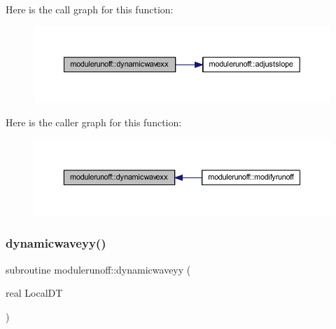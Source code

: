 Here is the call graph for this function\+:
\nopagebreak
\begin{figure}[H]
\begin{center}
\leavevmode
\includegraphics[width=350pt]{namespacemodulerunoff_a18db45ec88a4cf69a97c7b95648bc264_cgraph}
\end{center}
\end{figure}
Here is the caller graph for this function\+:
\nopagebreak
\begin{figure}[H]
\begin{center}
\leavevmode
\includegraphics[width=350pt]{namespacemodulerunoff_a18db45ec88a4cf69a97c7b95648bc264_icgraph}
\end{center}
\end{figure}
\mbox{\label{namespacemodulerunoff_a86d4b0ce5f4e6efc7d53702b40d97604}} 
\subsubsection{\texorpdfstring{dynamicwaveyy()}{dynamicwaveyy()}}
{\footnotesize\ttfamily subroutine modulerunoff\+::dynamicwaveyy (\begin{DoxyParamCaption}\item[{real}]{Local\+DT }\end{DoxyParamCaption})\hspace{0.3cm}{\ttfamily [private]}}

